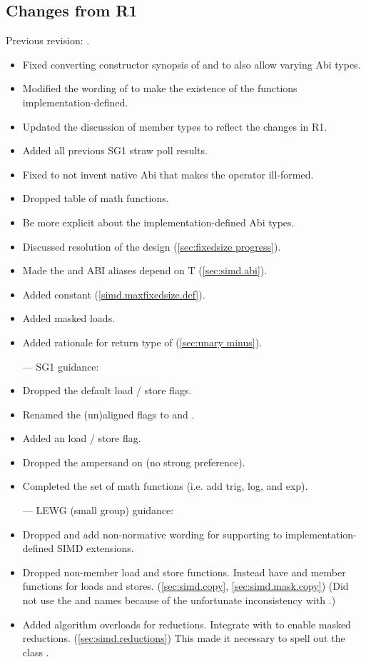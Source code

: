\subsection{Changes from R1}
Previous revision: \parencite{P0214R1}.
\begin{itemize}
    \item Fixed converting constructor synopsis of \simd and \mask to also allow varying Abi types.
    \item Modified the wording of  to make the existence of the functions implementation-defined.
    \item Updated the discussion of member types to reflect the changes in R1.
    \item Added all previous SG1 straw poll results.
    \item Fixed  to not invent native Abi that makes the operator ill-formed.
    \item Dropped table of math functions.
    \item Be more explicit about the implementation-defined Abi types.
    \item Discussed resolution of the \fixedsizeN design (\ref{sec:fixedsize progress}).
    \item Made the  and  ABI aliases depend on \type T (\ref{sec:simd.abi}).
    \item Added  constant (\ref{simd.maxfixedsize.def}).
    \item Added masked loads.
    \item Added rationale for return type of \simd[::operator-()] (\ref{sec:unary minus}).
  \color{black}\item[---] SG1 guidance:
    \item Dropped the default load / store flags.
    \item Renamed the (un)aligned flags to  and .
    \item Added an  load / store flag.
    \item Dropped the ampersand on  (no strong preference).
    \item Completed the set of math functions (i.e. add trig, log, and exp).
  \color{black}\item[---] LEWG (small group) guidance:
    \item Dropped  and add non-normative wording for supporting  to implementation-defined SIMD extensions.
    \item Dropped non-member load and store functions.
    Instead have  and  member functions for loads and stores. (\ref{sec:simd.copy}, \ref{sec:simd.mask.copy})
    (Did not use the  and  names because of the unfortunate inconsistency with \std{}.)
    \item Added algorithm overloads for \simd reductions.
    Integrate with  to enable masked reductions. (\ref{sec:simd.reductions})
    This made it necessary to spell out the class .
\end{itemize}
